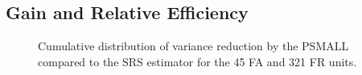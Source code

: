 \newpage
\subsection{Gain and Relative Efficiency}
\label{sec:gain_releff}



















\begin{figure}[H]
	\centering
	\caption{Cumulative distribution of variance reduction by the PSMALL compared to the SRS estimator for the  45 FA and 321 FR units.}
	\label{fig:gain}
\end{figure}





